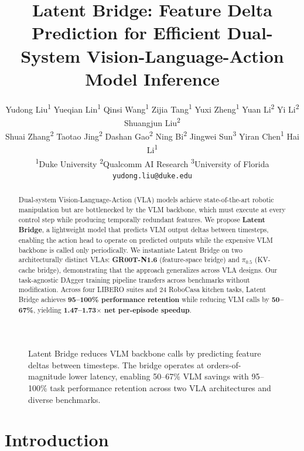 \documentclass{article}
\title{Latent Bridge: Feature Delta Prediction for Efficient Dual-System Vision-Language-Action Model Inference}
\author{%
  Yudong Liu\textsuperscript{1} \quad
  Yueqian Lin\textsuperscript{1} \quad
  Qinsi Wang\textsuperscript{1} \quad
  Zijia Tang\textsuperscript{1} \quad
  Yuxi Zheng\textsuperscript{1} \quad
  Yuan Li\textsuperscript{2} \quad
  Yi Li\textsuperscript{2} \quad
  Shuangjun Liu\textsuperscript{2} \\
  Shuai Zhang\textsuperscript{2} \quad
  Taotao Jing\textsuperscript{2} \quad
  Dashan Gao\textsuperscript{2} \quad
  Ning Bi\textsuperscript{2} \quad
  Jingwei Sun\textsuperscript{3} \quad
  Yiran Chen\textsuperscript{1} \quad
  Hai Li\textsuperscript{1} \\[0.5em]
  \textsuperscript{1}Duke University \quad
  \textsuperscript{2}Qualcomm AI Research \quad
  \textsuperscript{3}University of Florida \\
  \texttt{yudong.liu@duke.edu}
}
\begin{document}
\maketitle

\begin{abstract}
Dual-system Vision-Language-Action (VLA) models achieve state-of-the-art robotic manipulation but are bottlenecked by the VLM backbone, which must execute at every control step while producing temporally redundant features.
We propose \textbf{Latent Bridge}, a lightweight model that predicts VLM output deltas between timesteps, enabling the action head to operate on predicted outputs while the expensive VLM backbone is called only periodically.
We instantiate Latent Bridge on two architecturally distinct VLAs: \textbf{GR00T-N1.6} (feature-space bridge) and \textbf{$\pi_{0.5}$} (KV-cache bridge), demonstrating that the approach generalizes across VLA designs.
Our task-agnostic DAgger training pipeline transfers across benchmarks without modification.
Across four LIBERO suites and 24 RoboCasa kitchen tasks, Latent Bridge achieves \textbf{95--100\% performance retention} while reducing VLM calls by \textbf{50--67\%}, yielding \textbf{1.47--1.73$\times$ net per-episode speedup}.
\end{abstract}

\begin{figure}[t]
\centering
{}
\caption{Latent Bridge reduces VLM backbone calls by predicting feature deltas between timesteps. The bridge operates at orders-of-magnitude lower latency, enabling 50--67\% VLM savings with 95--100\% task performance retention across two VLA architectures and diverse benchmarks.}
\label{fig:teaser}
\end{figure}

\section{Introduction}
\end{document}
